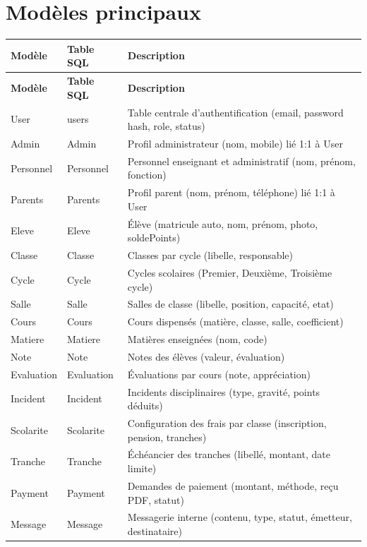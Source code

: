 \documentclass[12pt,a4paper]{report}
\begin{document}
\section{Modèles principaux}
\begin{longtable}{|p{3cm}|p{4cm}|p{7.5cm}|}
\hline
\textbf{Modèle} & \textbf{Table SQL} & \textbf{Description} \\
\hline
\endfirsthead
\hline
\textbf{Modèle} & \textbf{Table SQL} & \textbf{Description} \\
\hline
\endhead
User & users & Table centrale d'authentification (email, password hash, role, status) \\
\hline
Admin & Admin & Profil administrateur (nom, mobile) lié 1:1 à User \\
\hline
Personnel & Personnel & Personnel enseignant et administratif (nom, prénom, fonction) \\
\hline
Parents & Parents & Profil parent (nom, prénom, téléphone) lié 1:1 à User \\
\hline
Eleve & Eleve & Élève (matricule auto, nom, prénom, photo, soldePoints) \\
\hline
Classe & Classe & Classes par cycle (libelle, responsable) \\
\hline
Cycle & Cycle & Cycles scolaires (Premier, Deuxième, Troisième cycle) \\
\hline
Salle & Salle & Salles de classe (libelle, position, capacité, etat) \\
\hline
Cours & Cours & Cours dispensés (matière, classe, salle, coefficient) \\
\hline
Matiere & Matiere & Matières enseignées (nom, code) \\
\hline
Note & Note & Notes des élèves (valeur, évaluation) \\
\hline
Evaluation & Evaluation & Évaluations par cours (note, appréciation) \\
\hline
Incident & Incident & Incidents disciplinaires (type, gravité, points déduits) \\
\hline
Scolarite & Scolarite & Configuration des frais par classe (inscription, pension, tranches) \\
\hline
Tranche & Tranche & Échéancier des tranches (libellé, montant, date limite) \\
\hline
Payment & Payment & Demandes de paiement (montant, méthode, reçu PDF, statut) \\
\hline
Message & Message & Messagerie interne (contenu, type, statut, émetteur, destinataire) \\

\end{longtable}
\end{document}
